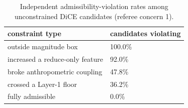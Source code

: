 \begin{table}
\caption{Independent admissibility-violation rates among unconstrained DiCE candidates (referee concern 1).}
\label{tab:rev_violbreak}
\begin{tabular}{ll}
\toprule
constraint type & candidates violating \\
\midrule
outside magnitude box & 100.0\% \\
increased a reduce-only feature & 92.0\% \\
broke anthropometric coupling & 47.8\% \\
crossed a Layer-1 floor & 36.2\% \\
fully admissible & 0.0\% \\
\bottomrule
\end{tabular}
\end{table}
